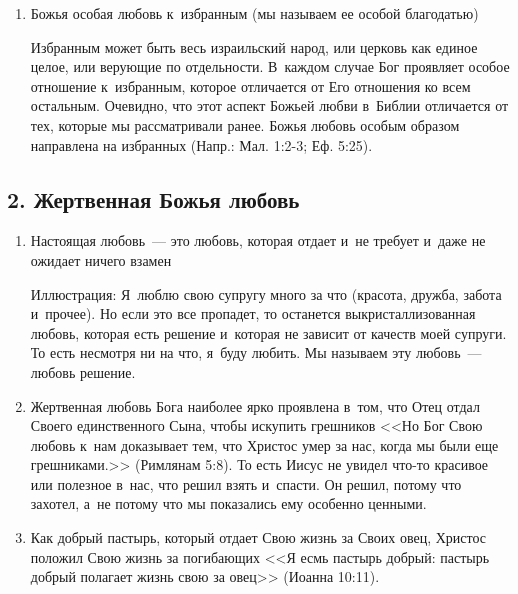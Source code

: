 \documentclass[a4paper,12pt]{article}
\begin{document}
\begin{enumerate}
        \item Божья особая любовь к~избранным (мы называем ее особой благодатью)

            Избранным может быть весь израильский народ, или церковь как единое целое, или верующие по отдельности. В~каждом случае Бог проявляет особое отношение к~избранным, которое отличается от Его отношения ко всем остальным. Очевидно, что этот аспект Божьей любви в~Библии отличается от тех, которые мы рассматривали ранее. Божья любовь особым образом направлена на избранных (Напр.: Мал. 1:2-3; Еф. 5:25).
\end{enumerate}

\subsection{2. Жертвенная Божья любовь}
\begin{enumerate}
    \item Настоящая любовь~--- это любовь, которая отдает и~не требует и~даже не ожидает ничего взамен
    
    Иллюстрация: Я~люблю свою супругу много за что (красота, дружба, забота и~прочее). Но если это все пропадет, то останется выкристаллизованная любовь, которая есть решение и~которая не зависит от качеств моей супруги. То есть несмотря ни на что, я~буду любить. Мы называем эту любовь~--- любовь решение.
    
    \item Жертвенная любовь Бога наиболее ярко проявлена в~том, что Отец отдал Своего единственного Сына, чтобы искупить грешников <<Но Бог Свою любовь к~нам доказывает тем, что Христос умер за нас, когда мы были еще грешниками.>> (Римлянам 5:8). То есть Иисус не увидел что-то красивое или полезное в~нас, что решил взять и~спасти. Он решил, потому что захотел, а~не потому что мы показались ему особенно ценными.
    
    \item Как добрый пастырь, который отдает Свою жизнь за Своих овец, Христос положил Свою жизнь за погибающих <<Я есмь пастырь добрый: пастырь добрый полагает жизнь свою за овец>> (Иоанна 10:11).
\end{enumerate}
\end{document}
